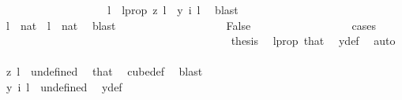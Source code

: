\begin{isabellebody}
\ \ \ \ \ \ \ \ \ \ \ \ \ \ \ \ \isamarkupfalse%
\ \isamarkupfalse%
\ l\ \ l{\isacharunderscore}{\kern0pt}prop{\isacharcolon}{\kern0pt}\ {\isachardoublequoteopen}z\ l\ {\isasymnoteq}\ y\ i\ l{\isachardoublequoteclose}\ \isamarkupfalse%
\ blast\isanewline
\ \ \ \ \ \ \ \ \ \ \ \ \ \ \ \ \isamarkupfalse%
\ {\isachardoublequoteopen}l\ {\isasymin}\ {\isacharbraceleft}{\kern0pt}{\isachardot}{\kern0pt}{\isachardot}{\kern0pt}{\isacharless}{\kern0pt}{}{\isacharcolon}{\kern0pt}{\isacharcolon}{\kern0pt}nat{\isacharbraceright}{\kern0pt}{\isachardoublequoteclose}\ {\isacharbar}{\kern0pt}\ {\isachardoublequoteopen}l\ {\isasymnotin}\ {\isacharbraceleft}{\kern0pt}{\isachardot}{\kern0pt}{\isachardot}{\kern0pt}{\isacharless}{\kern0pt}{}{\isacharcolon}{\kern0pt}{\isacharcolon}{\kern0pt}nat{\isacharbraceright}{\kern0pt}{\isachardoublequoteclose}\ \isamarkupfalse%
\ blast\isanewline
\ \ \ \ \ \ \ \ \ \ \ \ \ \ \ \ \isamarkupfalse%
\ \isamarkupfalse%
\ False\isanewline
\ \ \ \ \ \ \ \ \ \ \ \ \ \ \ \ \isamarkupfalse%
\ cases\isanewline
\ \ \ \ \ \ \ \ \ \ \ \ \ \ \ \ \ \ \isamarkupfalse%
\ {}\isanewline
\ \ \ \ \ \ \ \ \ \ \ \ \ \ \ \ \ \ \isamarkupfalse%
\ \isamarkupfalse%
\ {\isacharquery}{\kern0pt}thesis\ \isamarkupfalse%
\ l{\isacharunderscore}{\kern0pt}prop\ that{\isacharparenleft}{\kern0pt}{}{\isacharparenright}{\kern0pt}\ \isamarkupfalse%
\ y{\isacharunderscore}{\kern0pt}def\ \isamarkupfalse%
\ auto\isanewline
\ \ \ \ \ \ \ \ \ \ \ \ \ \ \ \ \isamarkupfalse%
\isanewline
\ \ \ \ \ \ \ \ \ \ \ \ \ \ \ \ \ \ \isamarkupfalse%
\ {}\isanewline
\ \ \ \ \ \ \ \ \ \ \ \ \ \ \ \ \ \ \isamarkupfalse%
\ \isamarkupfalse%
\ {\isachardoublequoteopen}z\ l\ {\isacharequal}{\kern0pt}\ undefined{\isachardoublequoteclose}\ \isamarkupfalse%
\ that\ \isamarkupfalse%
\ cube{\isacharunderscore}{\kern0pt}def\ \isamarkupfalse%
\ blast\isanewline
\ \ \ \ \ \ \ \ \ \ \ \ \ \ \ \ \ \ \isamarkupfalse%
\ \isamarkupfalse%
\ {\isachardoublequoteopen}y\ i\ l\ {\isacharequal}{\kern0pt}\ undefined{\isachardoublequoteclose}\ \isamarkupfalse%
\ y{\isacharunderscore}{\kern0pt}def\ \isamarkupfalse%

\end{isabellebody}
